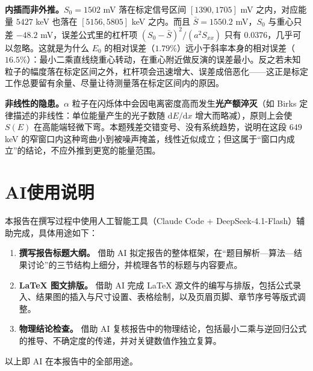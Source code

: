 \documentclass[UTF8,a4paper,12pt]{ctexart}
\begin{document}
\textbf{内插而非外推。}$S_0=1502$ mV 落在标定信号区间 $[1390,1705]$ mV 之内，对应能量 $5427$ keV 也落在 $[5156,5805]$ keV 之内。而且 $\bar S=1550.2$ mV，$S_0$ 与重心只差 $-48.2$ mV，误差公式里的杠杆项 $(S_0-\bar S)^2/(a^2S_{xx})$ 只有 $0.0376$，几乎可以忽略。这就是为什么 $E_0$ 的相对误差（$1.79\%$）远小于斜率本身的相对误差（$16.5\%$）：最小二乘直线绕重心转动，在重心附近做反演的误差最小。反之若未知粒子的幅度落在标定区间之外，杠杆项会迅速增大、误差成倍恶化——这正是标定工作总要留有余量、尽量让待测量落在标定区间内的原因。

\textbf{非线性的隐患。}$\alpha$ 粒子在闪烁体中会因电离密度高而发生\textbf{光产额淬灭}（如 Birks 定律描述的非线性：单位能量产生的光子数随 $\mathrm{d}E/\mathrm{d}x$ 增大而略减），原则上会使 $S(E)$ 在高能端轻微下弯。本题残差交错变号、没有系统趋势，说明在这段 $649$ keV 的窄窗口内这种弯曲小到被噪声掩盖，线性近似成立；但这属于“窗口内成立”的结论，不应外推到更宽的能量范围。

\section{AI使用说明}

本报告在撰写过程中使用人工智能工具（Claude Code + DeepSeek-4.1-Flash）辅助完成，具体用途如下：

\begin{enumerate}
  \item \textbf{撰写报告标题大纲。} 借助 AI 拟定报告的整体框架，在“题目解析—算法—结果讨论”的三节结构上细分，并梳理各节的标题与内容要点。
  \item \textbf{LaTeX 图文排版。} 借助 AI 完成 LaTeX 源文件的编写与排版，包括公式录入、结果图的插入与尺寸设置、表格绘制，以及页眉页脚、章节序号等版式调整。
  \item \textbf{物理结论检查。} 借助 AI 复核报告中的物理结论，包括最小二乘与逆回归公式的推导、不确定度的传递，并对关键数值作独立复算。
\end{enumerate}

以上即 AI 在本报告中的全部用途。
\end{document}
